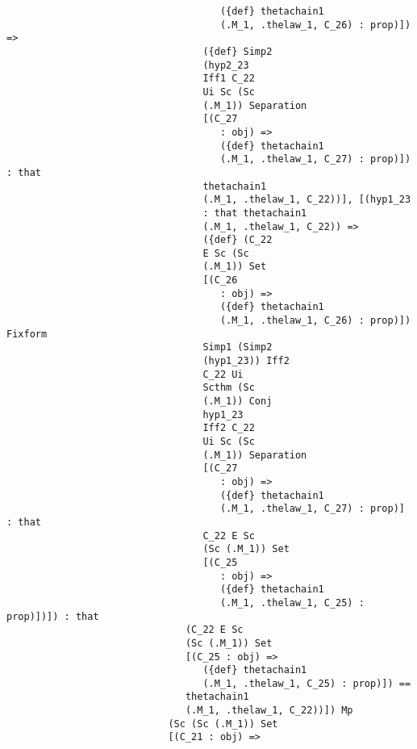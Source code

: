 \documentclass[12pt]{article}
\begin{document}
\begin{verbatim}
                                     ({def} thetachain1 
                                     (.M_1, .thelaw_1, C_26) : prop)]) => 
                                  ({def} Simp2 
                                  (hyp2_23 
                                  Iff1 C_22 
                                  Ui Sc (Sc 
                                  (.M_1)) Separation 
                                  [(C_27 
                                     : obj) => 
                                     ({def} thetachain1 
                                     (.M_1, .thelaw_1, C_27) : prop)]) : that 
                                  thetachain1 
                                  (.M_1, .thelaw_1, C_22))], [(hyp1_23 
                                  : that thetachain1 
                                  (.M_1, .thelaw_1, C_22)) => 
                                  ({def} (C_22 
                                  E Sc (Sc 
                                  (.M_1)) Set 
                                  [(C_26 
                                     : obj) => 
                                     ({def} thetachain1 
                                     (.M_1, .thelaw_1, C_26) : prop)]) Fixform 
                                  Simp1 (Simp2 
                                  (hyp1_23)) Iff2 
                                  C_22 Ui 
                                  Scthm (Sc 
                                  (.M_1)) Conj 
                                  hyp1_23 
                                  Iff2 C_22 
                                  Ui Sc (Sc 
                                  (.M_1)) Separation 
                                  [(C_27 
                                     : obj) => 
                                     ({def} thetachain1 
                                     (.M_1, .thelaw_1, C_27) : prop)] : that 
                                  C_22 E Sc 
                                  (Sc (.M_1)) Set 
                                  [(C_25 
                                     : obj) => 
                                     ({def} thetachain1 
                                     (.M_1, .thelaw_1, C_25) : prop)])]) : that 
                               (C_22 E Sc 
                               (Sc (.M_1)) Set 
                               [(C_25 : obj) => 
                                  ({def} thetachain1 
                                  (.M_1, .thelaw_1, C_25) : prop)]) == 
                               thetachain1 
                               (.M_1, .thelaw_1, C_22))]) Mp 
                            (Sc (Sc (.M_1)) Set 
                            [(C_21 : obj) => 

\end{verbatim}
\end{document}
